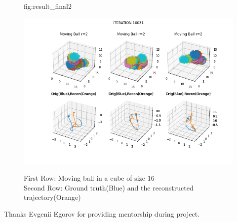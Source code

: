 \documentclass{jmlr} %
\begin{document}
\begin{figure}[!htpb]
\floatconts
  {fig:result_final2}
  {\caption{First Row: Moving ball in a cube of size 16\\
  Second Row: Ground truth(Blue) and the reconstructed trajectory(Orange)}}
    {\includegraphics[width=0.95\linewidth]{GPVAE3D/images/result_final2}}
\end{figure}


\acks{}
Thanks Evgenii Egorov for providing mentorship during project.

\end{document}

